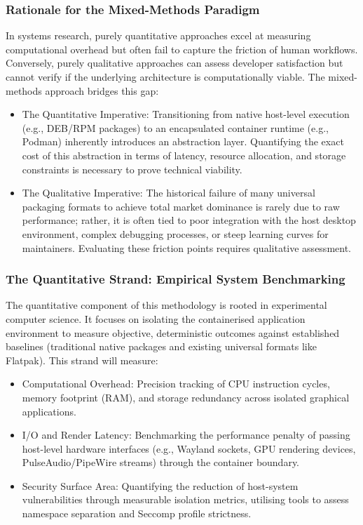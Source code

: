 \documentclass[journal,onecolumn]{IEEEtran}
\begin{document}
\subsubsection{Rationale for the Mixed-Methods Paradigm}
In systems research, purely quantitative approaches excel at measuring computational overhead but often fail to capture the friction of human workflows. Conversely, purely qualitative approaches can assess developer satisfaction but cannot verify if the underlying architecture is computationally viable. The mixed-methods approach bridges this gap:
\begin{itemize}
    \item The Quantitative Imperative: Transitioning from native host-level execution (e.g., DEB/RPM packages) to an encapsulated container runtime (e.g., Podman) inherently introduces an abstraction layer. Quantifying the exact cost of this abstraction in terms of latency, resource allocation, and storage constraints is necessary to prove technical viability.
    \item The Qualitative Imperative: The historical failure of many universal packaging formats to achieve total market dominance is rarely due to raw performance; rather, it is often tied to poor integration with the host desktop environment, complex debugging processes, or steep learning curves for maintainers. Evaluating these friction points requires qualitative assessment.
\end{itemize}

\subsubsection{The Quantitative Strand: Empirical System Benchmarking}
The quantitative component of this methodology is rooted in experimental computer science. It focuses on isolating the containerised application environment to measure objective, deterministic outcomes against established baselines (traditional native packages and existing universal formats like Flatpak). This strand will measure:
\begin{itemize}
    \item Computational Overhead: Precision tracking of CPU instruction cycles, memory footprint (RAM), and storage redundancy across isolated graphical applications.
    \item I/O and Render Latency: Benchmarking the performance penalty of passing host-level hardware interfaces (e.g., Wayland sockets, GPU rendering devices, PulseAudio/PipeWire streams) through the container boundary.
    \item Security Surface Area: Quantifying the reduction of host-system vulnerabilities through measurable isolation metrics, utilising tools to assess namespace separation and Seccomp profile strictness.
\end{itemize}
\end{document}
